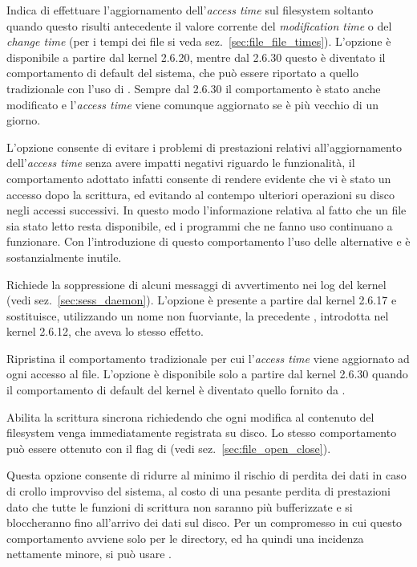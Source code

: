 \begin{basedescript}{\desclabelwidth{2.0cm}\desclabelstyle{\nextlinelabel}}
\item[\constd{MS\_RELATIME}] Indica di effettuare l'aggiornamento
  dell'\textit{access time} sul filesystem soltanto quando questo risulti
  antecedente il valore corrente del \textit{modification time} o del
  \textit{change time} (per i tempi dei file si veda
  sez.~\ref{sec:file_file_times}). L'opzione è disponibile a partire dal
  kernel 2.6.20, mentre dal 2.6.30 questo è diventato il comportamento di
  default del sistema, che può essere riportato a quello tradizionale con
  l'uso di . Sempre dal 2.6.30 il comportamento è stato
  anche modificato e l'\textit{access time} viene comunque aggiornato se è più
  vecchio di un giorno.

  L'opzione consente di evitare i problemi di prestazioni relativi
  all'aggiornamento dell'\textit{access time} senza avere impatti negativi
  riguardo le funzionalità, il comportamento adottato infatti consente di
  rendere evidente che vi è stato un accesso dopo la scrittura, ed evitando al
  contempo ulteriori operazioni su disco negli accessi successivi. In questo
  modo l'informazione relativa al fatto che un file sia stato letto resta
  disponibile, ed i programmi che ne fanno uso continuano a funzionare. Con
  l'introduzione di questo comportamento l'uso delle alternative
   e  è sostanzialmente inutile.

\item[\constd{MS\_SILENT}] Richiede la soppressione di alcuni messaggi di
  avvertimento nei log del kernel (vedi sez.~\ref{sec:sess_daemon}). L'opzione
  è presente a partire dal kernel 2.6.17 e sostituisce, utilizzando un nome
  non fuorviante, la precedente , introdotta nel kernel
  2.6.12, che aveva lo stesso effetto.

\item[\constd{MS\_STRICTATIME}] Ripristina il comportamento tradizionale per
  cui l'\textit{access time} viene aggiornato ad ogni accesso al
  file. L'opzione è disponibile solo a partire dal kernel 2.6.30 quando il
  comportamento di default del kernel è diventato quello fornito da
  .

\item[\constd{MS\_SYNCHRONOUS}] Abilita la scrittura sincrona richiedendo che
  ogni modifica al contenuto del filesystem venga immediatamente registrata su
  disco. Lo stesso comportamento può essere ottenuto con il flag
   di  (vedi sez.~\ref{sec:file_open_close}).

  Questa opzione consente di ridurre al minimo il rischio di perdita dei dati
  in caso di crollo improvviso del sistema, al costo di una pesante perdita di
  prestazioni dato che tutte le funzioni di scrittura non saranno più
  bufferizzate e si bloccheranno fino all'arrivo dei dati sul disco. Per un
  compromesso in cui questo comportamento avviene solo per le directory, ed ha
  quindi una incidenza nettamente minore, si può usare .

\end{basedescript}

